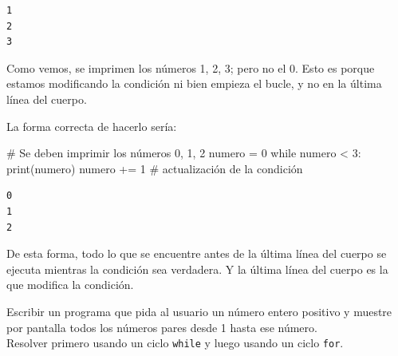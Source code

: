 \documentclass[
  letterpaper,
  DIV=11,
  numbers=noendperiod]{scrreprt}
\newenvironment{Shaded}{\begin{snugshade}}{\end{snugshade}}
\newcommand{\BuiltInTok}[1]{\textcolor[rgb]{0.00,0.23,0.31}{#1}}
\newcommand{\CommentTok}[1]{\textcolor[rgb]{0.37,0.37,0.37}{#1}}
\newcommand{\ControlFlowTok}[1]{\textcolor[rgb]{0.00,0.23,0.31}{#1}}
\newcommand{\DecValTok}[1]{\textcolor[rgb]{0.68,0.00,0.00}{#1}}
\newcommand{\NormalTok}[1]{\textcolor[rgb]{0.00,0.23,0.31}{#1}}
\newcommand{\OperatorTok}[1]{\textcolor[rgb]{0.37,0.37,0.37}{#1}}
\begin{document}
\begin{verbatim}
1
2
3
\end{verbatim}

Como vemos, se imprimen los números 1, 2, 3; pero no el 0. Esto es
porque estamos modificando la condición ni bien empieza el bucle, y no
en la última línea del cuerpo.

La forma correcta de hacerlo sería:

\begin{Shaded}
\begin{Highlighting}[]
\CommentTok{\# Se deben imprimir los números 0, 1, 2}
\NormalTok{numero }\OperatorTok{=} \DecValTok{0}
\ControlFlowTok{while}\NormalTok{ numero }\OperatorTok{\textless{}} \DecValTok{3}\NormalTok{:}
  \BuiltInTok{print}\NormalTok{(numero)}
\NormalTok{  numero }\OperatorTok{+=} \DecValTok{1}     \CommentTok{\# actualización de la condición}
\end{Highlighting}
\end{Shaded}

\begin{verbatim}
0
1
2
\end{verbatim}

De esta forma, todo lo que se encuentre antes de la última línea del
cuerpo se ejecuta mientras la condición sea verdadera. Y la última línea
del cuerpo es la que modifica la condición.

\hfill\break
\hfill\break

\begin{tcolorbox}[enhanced jigsaw, colframe=quarto-callout-warning-color-frame, opacityback=0, opacitybacktitle=0.6, bottomrule=.15mm, toprule=.15mm, coltitle=black, breakable, colback=white, leftrule=.75mm, titlerule=0mm, bottomtitle=1mm, toptitle=1mm, rightrule=.15mm, title=\textcolor{quarto-callout-warning-color}{\faExclamationTriangle}\hspace{0.5em}{Ejercicio Desafío}, arc=.35mm, left=2mm, colbacktitle=quarto-callout-warning-color!10!white]

Escribir un programa que pida al usuario un número entero positivo y
muestre por pantalla todos los números pares desde 1 hasta ese número.\\
Resolver primero usando un ciclo \texttt{while} y luego usando un ciclo
\texttt{for}.

\end{tcolorbox}
\end{document}
